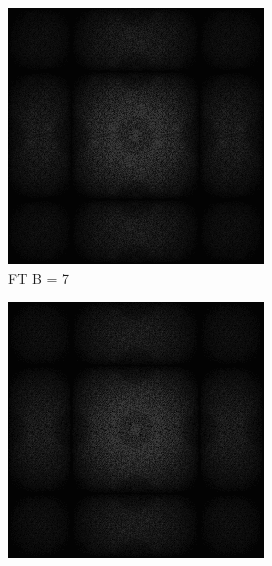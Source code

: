 \begin{figure}[H]
\begin{tcolorbox}[boxrule=4pt,sharp corners=downhill,title=Verschiedene Blockgrößen]
\begin{subfigure}[b]{0.2\linewidth}
      \includegraphics[width=\linewidth]{content/TemporalerAlg/Bilder/Sorting/DiffDimensions/7/seed_debug_5.0_small.png}
      \caption{FT B = 7}
      \label{pic:fftB_7}
    \end{subfigure}
    \begin{subfigure}[b]{0.2\linewidth}
      \includegraphics[width=\linewidth]{content/TemporalerAlg/Bilder/Sorting/DiffDimensions/8/seed_debug_5.0_small.png}

\end{subfigure}
\end{tcolorbox}
\end{figure}
